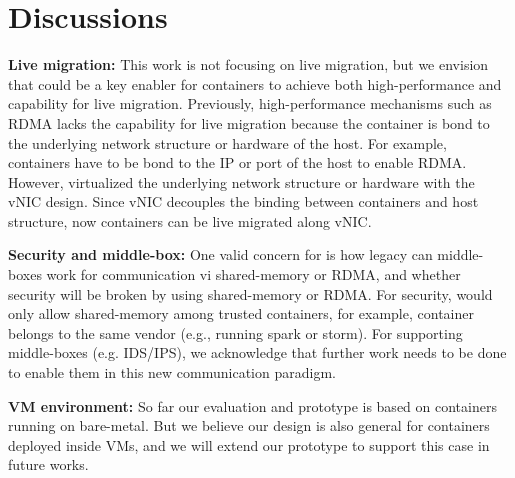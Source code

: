 \section{Discussions} \label{sec:discussion}


\textbf{Live migration:} 
This work is not focusing on live migration, but we envision that \sysname could be a key enabler
for containers to achieve both high-performance and capability for live migration.
Previously, high-performance mechanisms such as RDMA lacks the capability for live migration because
the container is bond to the underlying network structure or hardware of the host.
For example, containers have to be bond to the IP or port of the host to enable RDMA.
However, \sysname virtualized the underlying network structure or hardware with the vNIC design.
Since vNIC decouples the binding between containers and host structure, 
now containers can be live migrated along vNIC.

\textbf{Security and middle-box:}
One valid concern for \sysname is how legacy can middle-boxes work for communication
vi shared-memory or RDMA, and whether security will be broken by using shared-memory or RDMA.
For security, \sysname would only allow shared-memory among trusted containers, for example,
container belongs to the same vendor (e.g., running spark or storm).
For supporting middle-boxes (e.g. IDS/IPS), we acknowledge that further work needs to be done
to enable them in this new communication paradigm.


\textbf{VM environment:}
So far our evaluation and prototype is based on containers running on bare-metal. 
But we believe our design is also general for containers deployed inside VMs, and 
we will extend our prototype to support this case in future works.

